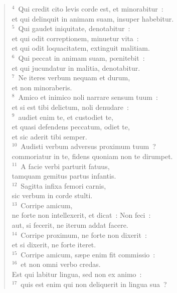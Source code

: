 \begin{verse}${}^{4}$~Qui credit cito levis corde est, et minorabitur~:\\ et qui delinquit in animam suam, insuper habebitur.\\
${}^{5}$~Qui gaudet iniquitate, denotabitur~:\\ et qui odit correptionem, minuetur vita~:\\ et qui odit loquacitatem, extinguit malitiam.\\
${}^{6}$~Qui peccat in animam suam, pœnitebit~:\\ et qui jucundatur in malitia, denotabitur.\\
${}^{7}$~Ne iteres verbum nequam et durum,\\ et non minoraberis.\\
${}^{8}$~Amico et inimico noli narrare sensum tuum~:\\ et si est tibi delictum, noli denudare~:\\
${}^{9}$~audiet enim te, et custodiet te,\\ et quasi defendens peccatum, odiet te,\\ et sic aderit tibi semper.\\
${}^{10}$~Audisti verbum adversus proximum tuum~?\\ commoriatur in te, fidens quoniam non te dirumpet.\\
${}^{11}$~A facie verbi parturit fatuus,\\ tamquam gemitus partus infantis.\\
${}^{12}$~Sagitta infixa femori carnis,\\ sic verbum in corde stulti.\\
${}^{13}$~Corripe amicum,\\ ne forte non intellexerit, et dicat~: Non feci~:\\ aut, si fecerit, ne iterum addat facere.\\
${}^{14}$~Corripe proximum, ne forte non dixerit~:\\ et si dixerit, ne forte iteret.\\
${}^{15}$~Corripe amicum, s\ae pe enim fit commissio~:\\
${}^{16}$~et non omni verbo credas.\\ Est qui labitur lingua, sed non ex animo~:\\
${}^{17}$~quis est enim qui non deliquerit in lingua sua~?\end{verse}


